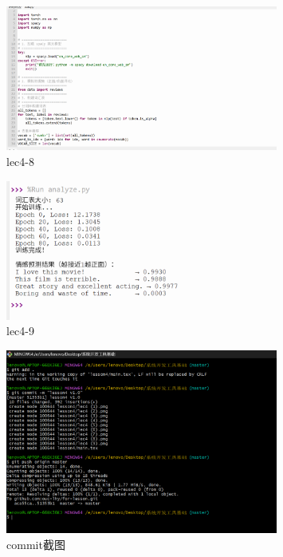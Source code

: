 \documentclass[a4paper, 12pt]{article}
\begin{document}
\begin{figure}[htbp]
    \centering
    \includegraphics[width=0.8\textwidth]{lec4 (8).png}
    \caption{lec4-8}
\end{figure}

\begin{figure}[htbp]
    \centering
    \includegraphics[width=0.8\textwidth]{lec4 (9).png}
    \caption{lec4-9}
\end{figure}

\begin{figure}[htbp]
    \centering
    \includegraphics[width=0.8\textwidth]{commit.png}
    \caption{commit截图}
\end{figure}

\newpage
\end{document}
